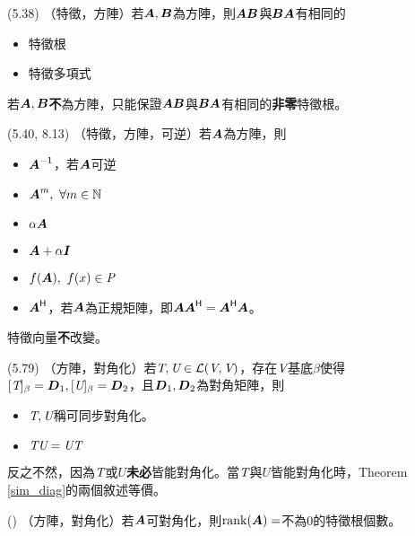 \item \begin{theorem}{(5.38)} （特徵，方陣）若$\boldsymbol{A}, \boldsymbol{B}$為方陣，則$\boldsymbol{AB}$與$\boldsymbol{BA}$有相同的
	\begin{itemize}
		\item 特徵根
		\item 特徵多項式
	\end{itemize}
	若$\boldsymbol{A}, \boldsymbol{B}$\textbf{不}為方陣，只能保證$\boldsymbol{AB}$與$\boldsymbol{BA}$有相同的\textbf{非零}特徵根。
\end{theorem}

\item \begin{theorem}{(5.40, 8.13)} （特徵，方陣，可逆）若$\boldsymbol{A}$為方陣，則
	\begin{itemize}
		\item $\boldsymbol{A}^{\mathsf{-1}}$，若$\boldsymbol{A}$可逆
		\item $\boldsymbol{A}^m, \ \forall m \in \mathbb{N}$
		\item $\alpha\boldsymbol{A}$
		\item $\boldsymbol{A} + \alpha\boldsymbol{I}$
		\item $f(\boldsymbol{A}), \ f(x) \in \textit{P}$
		\item $\boldsymbol{A}^{\mathsf{H}}$，若$\boldsymbol{A}$為正規矩陣，即$\boldsymbol{A}\boldsymbol{A}^{\mathsf{H}} = \boldsymbol{A}^{\mathsf{H}}\boldsymbol{A}$。
	\end{itemize}
	特徵向量\textbf{不}改變。
\end{theorem}

\item \begin{theorem}{(5.79)} （方陣，對角化）若$\textit{T}, \textit{U} \in \mathcal{L}(\textit{V}, \textit{V})$，存在$\textit{V}$基底$\beta$使得$[\textit{T}]_{\beta} = \boldsymbol{D}_1, [\textit{U}]_{\beta} = \boldsymbol{D}_2$，且$\boldsymbol{D}_1, \boldsymbol{D}_2$為對角矩陣，則
	\begin{itemize}
		\item $\textit{T}, \textit{U}$稱可同步對角化。\label{sim_diag}
		\item $\textit{T}\textit{U} = \textit{U}\textit{T}$
	\end{itemize}
	反之不然，因為$\textit{T}$或$\textit{U}$\textbf{未必}皆能對角化。當$\textit{T}$與$\textit{U}$皆能對角化時，Theorem \ref{sim_diag}的兩個敘述等價。
\end{theorem}

\item \begin{theorem}{()} （方陣，對角化）若$\boldsymbol{A}$可對角化，則$\operatorname{rank}(\boldsymbol{A}) = $不為$0$的特徵根個數。
\end{theorem}

